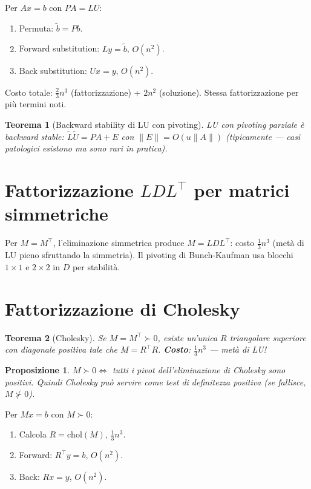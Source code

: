 \documentclass[11pt, a4paper, twoside]{book}
\theoremstyle{definition}
\theoremstyle{plain}
\newtheorem{thm}{Teorema}[chapter]
\newtheorem{prop}{Proposizione}[chapter]
\theoremstyle{remark}
\begin{document}
\begin{algobox}
Per $Ax = b$ con $PA = LU$:
\begin{enumerate}
  \item Permuta: $\tilde{b} = Pb$.
  \item Forward substitution: $Ly = \tilde{b}$, $O(n^2)$.
  \item Back substitution: $Ux = y$, $O(n^2)$.
\end{enumerate}
Costo totale: $\frac{2}{3}n^3$ (fattorizzazione) + $2n^2$ (soluzione). Stessa fattorizzazione per più termini noti.
\end{algobox}

\begin{thm}[Backward stability di LU con pivoting]
LU con pivoting parziale è backward stable: $\tilde{L}\tilde{U} = PA + E$ con $\|E\| = O(u\|A\|)$ (tipicamente — casi patologici esistono ma sono rari in pratica).
\end{thm}

\section{Fattorizzazione $LDL^\top$ per matrici simmetriche}

Per $M = M^\top$, l'eliminazione simmetrica produce $M = LDL^\top$: costo $\frac{1}{3}n^3$ (metà di LU pieno sfruttando la simmetria). Il pivoting di Bunch-Kaufman usa blocchi $1 \times 1$ e $2 \times 2$ in $D$ per stabilità.

\section{Fattorizzazione di Cholesky}
\label{sec:cholesky}

\begin{thm}[Cholesky]
Se $M = M^\top \succ 0$, esiste un'unica $R$ triangolare superiore con diagonale positiva tale che $M = R^\top R$. \textbf{Costo}: $\frac{1}{3}n^3$ — metà di LU!
\end{thm}

\begin{prop}
$M \succ 0 \Leftrightarrow$ tutti i pivot dell'eliminazione di Cholesky sono positivi. Quindi Cholesky può servire come test di definitezza positiva (se fallisce, $M \not\succ 0$).
\end{prop}

\begin{algobox}
Per $Mx = b$ con $M \succ 0$:
\begin{enumerate}
  \item Calcola $R = \mathrm{chol}(M)$, $\frac{1}{3}n^3$.
  \item Forward: $R^\top y = b$, $O(n^2)$.
  \item Back: $Rx = y$, $O(n^2)$.
\end{enumerate}
\end{algobox}
\end{document}
